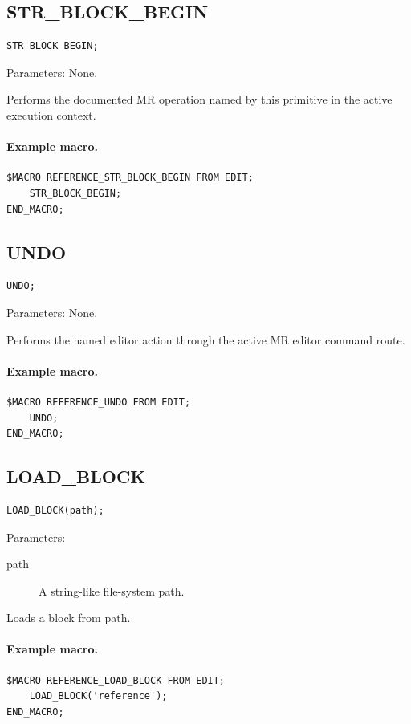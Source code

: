 \documentclass[a4paper,10pt,twoside,openany]{book}
\newenvironment{mrmacextension}{\begin{changebar}}{\end{changebar}}
\begin{document}
\label{prim:procedure-str-block-begin}
\subsection*{STR\_BLOCK\_BEGIN}
\begin{verbatim}
STR_BLOCK_BEGIN;
\end{verbatim}
Parameters: None.

Performs the documented MR operation named by this primitive in the active execution context.

\paragraph{Example macro.}
\begin{verbatim}
$MACRO REFERENCE_STR_BLOCK_BEGIN FROM EDIT;
    STR_BLOCK_BEGIN;
END_MACRO;
\end{verbatim}

\label{prim:procedure-undo}
\subsection*{UNDO}
\begin{verbatim}
UNDO;
\end{verbatim}
Parameters: None.

Performs the named editor action through the active MR editor command route.

\paragraph{Example macro.}
\begin{verbatim}
$MACRO REFERENCE_UNDO FROM EDIT;
    UNDO;
END_MACRO;
\end{verbatim}

\begin{mrmacextension}
\label{prim:procedure-load-block}
\subsection*{LOAD\_BLOCK}
\begin{verbatim}
LOAD_BLOCK(path);
\end{verbatim}
Parameters:
\begin{description}
\item[path] A string-like file-system path.
\end{description}

Loads a block from path.

\paragraph{Example macro.}
\begin{verbatim}
$MACRO REFERENCE_LOAD_BLOCK FROM EDIT;
    LOAD_BLOCK('reference');
END_MACRO;
\end{verbatim}
\end{mrmacextension}
\end{document}
